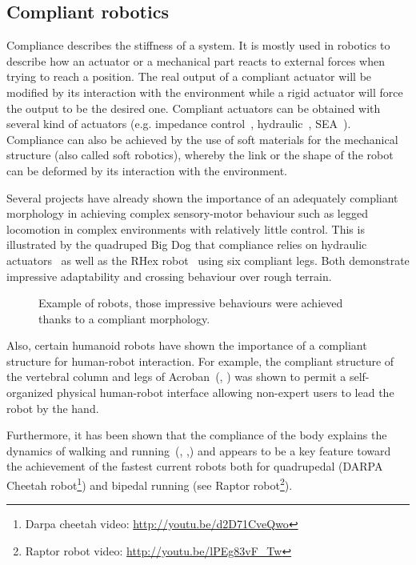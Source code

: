 \subsection{Compliant robotics} %
Compliance describes the stiffness of a system. It is mostly used in robotics to describe how an actuator or a mechanical part reacts to external forces when trying to reach a position. The real output of a compliant actuator will be modified by its interaction with the environment while a rigid actuator will force the output to be the desired one. Compliant actuators can be obtained with several kind of actuators (e.g. impedance control~\parencite{park2001impedance}, hydraulic~\parencite{alfayad2011high}, SEA~\parencite{pratt1995series}). Compliance can also be achieved by the use of soft materials for the mechanical structure (also called soft robotics), whereby the link or the shape of the robot can be deformed by its interaction with the environment.

Several projects have already shown the importance of an adequately compliant morphology in achieving complex sensory-motor behaviour such as legged locomotion in complex environments with relatively little control. This is illustrated by the quadruped Big Dog that compliance relies on hydraulic actuators~\parencite{raibert2008bigdog} as well as the RHex robot~\parencite{saranli2001rhex} using six compliant legs. Both demonstrate impressive adaptability and crossing behaviour over rough terrain.

\begin{figure}[tb]
\centering
    \hfil
    \caption{Example of robots, those impressive behaviours were achieved thanks to a compliant morphology.}
    \label{fig:compliant_robot}
\end{figure}

Also, certain humanoid robots have shown the importance of a compliant structure for human-robot interaction. For example, the compliant structure of the vertebral column and legs of Acroban~(\cite{ly2011bio}, \cite{Oudeyer2011}) was shown to permit a self-organized physical human-robot interface allowing non-expert users to lead the robot by the hand.

Furthermore, it has been shown that the compliance of the body explains the dynamics of walking and running~(\cite{Geyer2006}, \cite{iida2007bipedal},) and appears to be a key feature toward the achievement of the fastest current robots both for quadrupedal (DARPA Cheetah robot\footnote{Darpa cheetah video: \url{http://youtu.be/d2D71CveQwo}}) and bipedal running (see Raptor robot\footnote{Raptor robot video: \url{http://youtu.be/lPEg83vF_Tw}}).



